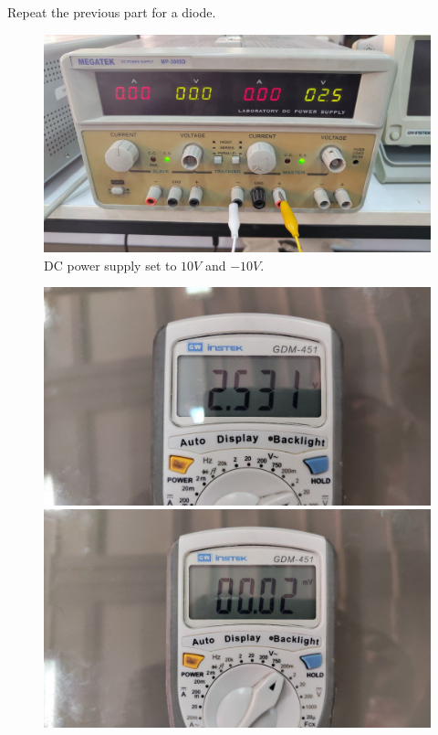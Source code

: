 \documentclass[11pt]{article}
\newcommand{\PicScale}{0.2}
\begin{document}
\begin{question}
\begin{subquestion}{Repeat the previous part for a diode.}
{            \begin{figure}[H]
                \centering
                \includegraphics[scale=\PicScale,angle=0]{Fig/25.jpeg}
                \caption{DC power supply set to $10V$ and $-10V$.}
            \end{figure}
            \begin{figure}[H]
                \centering
                \includegraphics[scale=0.08,angle=0]{Fig/26.jpeg}
                \includegraphics[scale=0.08,angle=0]{Fig/27.jpeg}

\end{figure}}
\end{subquestion}
\end{question}
\end{document}
